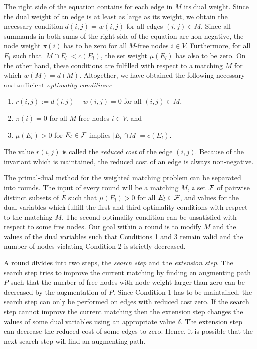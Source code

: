 \documentclass[12pt,twoside,a4paper]{article}
\begin{document}
The right side of the equation contains for each edge in $M$ its dual weight.
Since the dual weight of an edge is at least as large as its weight, we obtain 
the necessary condition $d(i,j) = w(i,j)$ for all edges $(i,j) \in M$.
Since all summands in both sums of the right side of the equation are non-negative, 
the node weight $\pi(i)$ has to be zero for all $M$-free nodes $i \in V$.
Furthermore, for all $E_l$ such that $|M \cap E_l| < c(E_l)$, the set weight
$\mu(E_l)$ has also to be zero. On the other hand, these conditions are fulfilled with
respect to a matching $M$ for which $w(M) = d(M)$. Altogether, we have obtained the 
following necessary and sufficient {\em optimality conditions\/}:
\begin{enumerate}
\item
$r(i,j) := d(i,j) - w(i,j) = 0$ for all $(i,j) \in M$,
\item
$\pi(i) = 0$ for all $M$-free nodes $i \in V$, and
\item 
$\mu(E_l) > 0$ for $E_l \in \cal F$ implies $|E_l \cap M| = c(E_l)$.
\end{enumerate}
The value $r(i,j)$ is called the {\em reduced cost\/} of the edge $(i,j)$. Because of
the invariant which is maintained, the reduced cost of an edge is always non-negative.

\medskip
The primal-dual method for the weighted matching problem can be separated into 
rounds. The input of every round will be a matching $M$, a set $\cal F$ of pairwise 
distinct subsets of $E$ such that $\mu(E_l) > 0$ for all $E_l \in \cal F$, and values 
for the dual variables which fulfill the first and third optimality conditions with 
respect to the matching $M$. The second optimality condition can be unsatisfied with 
respect to some free nodes. Our goal within a round is to modify $M$ and the 
values of the dual variables such that Conditions 1 and 3 remain valid
and the number of nodes violating Condition 2 is strictly decreased.

A round divides into two steps, the {\em search step\/} and the
{\em extension step}. The search step tries to improve
the current matching by finding an augmenting path $P$ such that the number
of free nodes with node weight larger than zero can be decreased by the 
augmentation of $P$. Since Condition 1 has to be maintained, the search step
can only be performed on edges with reduced cost zero. If the search step cannot
improve the current matching then the extension step
changes the values of some dual variables using an appropriate value $\delta$. 
The extension step can decrease the reduced cost of some edges to zero. Hence, 
it is possible that the next search step will find an augmenting path.
\end{document}
